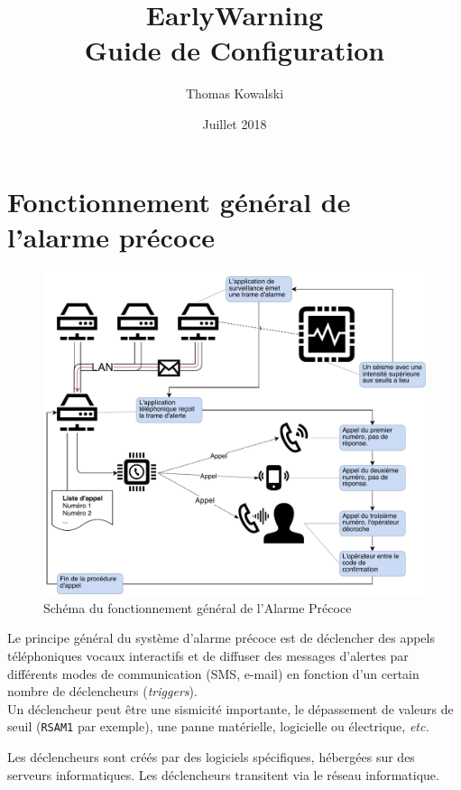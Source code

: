 \documentclass{article}
\title{\textbf{EarlyWarning}\\Guide de Configuration}
\author{Thomas Kowalski}
\date{Juillet 2018}
\begin{document}
\maketitle

\pagebreak
\tableofcontents

\pagebreak
\section{Fonctionnement général de l'alarme précoce}

\begin{center}
    \begin{figure}[h!]
      \includegraphics[width=\linewidth]{Illustrations/Fonctionnement_General.pdf}
      \caption{Schéma du fonctionnement général de l'Alarme Précoce}
      \label{fig:fonctionnement}
    \end{figure}
\end{center}

Le principe général du système d'alarme précoce est de déclencher des appels téléphoniques vocaux interactifs et de diffuser des messages d'alertes par différents modes de communication (SMS, e-mail) en fonction d'un certain nombre de déclencheurs (\emph{triggers}). \\
Un déclencheur peut être une sismicité importante, le dépassement de valeurs de seuil (\texttt{RSAM1} par exemple), une panne matérielle, logicielle ou électrique, \emph{etc.}

Les déclencheurs sont créés par des logiciels spécifiques, hébergées sur des serveurs informatiques. Les déclencheurs transitent via le réseau informatique.
\end{document}
